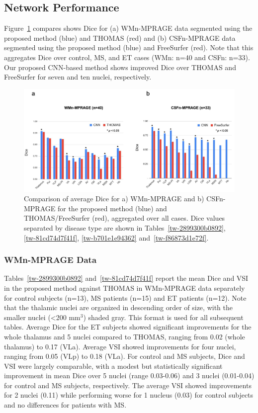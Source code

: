\documentclass[3p,,final,12pt]{elsarticle}
\begin{document}
\subsection{Network Performance}Figure~\ref{f-1b1c9f8fc2d4} compares shows Dice for (a) WMn-MPRAGE data segmented using the proposed method (blue) and THOMAS (red) and (b) CSFn-MPRAGE data segmented using the proposed method (blue) and FreeSurfer (red). Note that this aggregates Dice over control, MS, and ET cases (WMn: n=40 and CSFn: n=33). Our proposed CNN-based method shows improved Dice over THOMAS and FreeSurfer for seven and ten nuclei, respectively. 
\bgroup
{}
\begin{figure}[!htbp]
\centering \includegraphics{Thalamus/images/slide3.jpeg}
\makeatother 
\caption{Comparison of average Dice for a) WMn-MPRAGE and b) CSFn-MPRAGE for the proposed method (blue) and THOMAS/FreeSurfer (red), aggregated over all cases. Dice values separated by disease type are shown in Tables~\ref{tw-2899300b0892}, \ref{tw-81cd74d7f41f}, \ref{tw-b701e1e94362} and~\ref{tw-f86873d1e72f}.}
\label{f-1b1c9f8fc2d4}
\end{figure}
\egroup




\subsubsection{WMn-MPRAGE Data}Tables~\ref{tw-2899300b0892} and~\ref{tw-81cd74d7f41f} report the mean Dice and VSI in the proposed method against THOMAS in WMn-MPRAGE data separately for control subjects (n=13), MS patients (n=15) and ET patients (n=12). Note that the thalamic nuclei are organized in descending order of size, with the smaller nuclei ({\textless}200 mm\ensuremath{^{3}}) shaded gray. This format is used for all subsequent tables. Average Dice for the ET subjects showed significant improvements for the whole thalamus and 5 nuclei compared to THOMAS, ranging from 0.02 (whole thalamus) to 0.17 (VLa). Average VSI showed improvements for four nuclei, ranging from 0.05 (VLp) to 0.18 (VLa). For control and MS subjects, Dice and VSI were largely comparable, with a modest but statistically significant improvement in mean Dice over 5 nuclei (range 0.03-0.06) and 3 nuclei (0.01-0.04) for control and MS subjects, respectively. The average VSI showed improvements for 2 nuclei (0.11) while performing worse for 1 nucleus (0.03) for control subjects and no differences for patients with MS.
\end{document}
